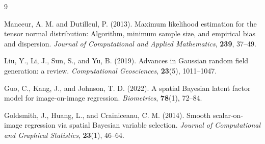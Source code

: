 \documentclass[10pt]{notes}
\begin{document}
\begin{thebibliography}{9}

Manceur, A. M. and Dutilleul, P. (2013).
Maximum likelihood estimation for the tensor normal distribution:
Algorithm, minimum sample size, and empirical bias and dispersion.
\textit{Journal of Computational and Applied Mathematics}, \textbf{239}, 37--49.

Liu, Y., Li, J., Sun, S., and Yu, B. (2019).
Advances in Gaussian random field generation: a review.
\textit{Computational Geosciences}, \textbf{23}(5), 1011--1047.

Guo, C., Kang, J., and Johnson, T. D. (2022).
A spatial Bayesian latent factor model for image-on-image regression.
\textit{Biometrics}, \textbf{78}(1), 72--84.

Goldsmith, J., Huang, L., and Crainiceanu, C. M. (2014).
Smooth scalar-on-image regression via spatial Bayesian variable selection.
\textit{Journal of Computational and Graphical Statistics}, \textbf{23}(1), 46--64.

\end{thebibliography}
\end{document}
